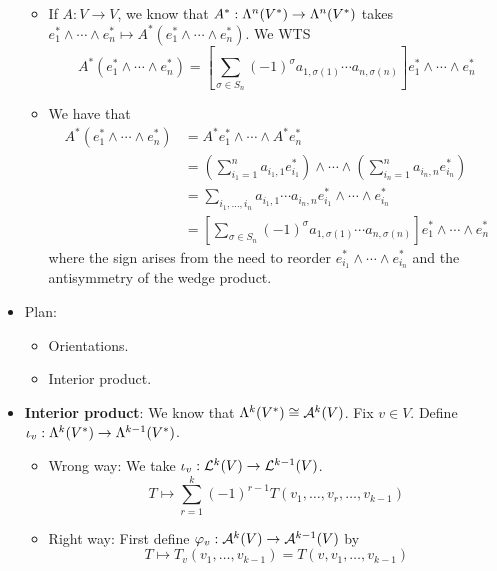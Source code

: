 \documentclass[../notes.tex]{subfiles}
\begin{document}
\begin{itemize}
    \begin{itemize}
        \item If $A:V\to V$, we know that $A^*:\lam[n]{V^*}\to\lam[n]{V^*}$ takes $e_1^*\wedge\cdots\wedge e_n^*\mapsto A^*(e_1^*\wedge\cdots\wedge e_n^*)$. We WTS
        \begin{equation*}
            A^*(e_1^*\wedge\cdots\wedge e_n^*) = \left[ \sum_{\sigma\in S_n}(-1)^\sigma a_{1,\sigma(1)}\cdots a_{n,\sigma(n)} \right]e_1^*\wedge\cdots\wedge e_n^*
        \end{equation*}
        \item We have that
        \begin{align*}
            A^*(e_1^*\wedge\cdots\wedge e_n^*) &= A^*e_1^*\wedge\cdots\wedge A^*e_n^*\\
            &= \left( \sum_{i_1=1}^na_{i_1,1}e_{i_1}^* \right)\wedge\cdots\wedge\left( \sum_{i_n=1}^na_{i_n,n}e_{i_n}^* \right)\\
            &= \sum_{i_1,\dots,i_n}a_{i_1,1}\cdots a_{i_n,n}e_{i_1}^*\wedge\cdots\wedge e_{i_n}^*\\
            &= \left[ \sum_{\sigma\in S_n}(-1)^\sigma a_{1,\sigma(1)}\cdots a_{n,\sigma(n)} \right]e_1^*\wedge\cdots\wedge e_n^*
        \end{align*}
        where the sign arises from the need to reorder $e_{i_1}^*\wedge\cdots\wedge e_{i_n}^*$ and the antisymmetry of the wedge product.
    \end{itemize}
    \item {}Plan:
    \begin{itemize}
        \item Orientations.
        \item Interior product.
    \end{itemize}
    \item \textbf{Interior product}: We know that $\lam[k]{V^*}\cong\alt[k]{V}$. Fix $v\in V$. Define $\iota_v:\lam[k]{V^*}\to\lam[k-1]{V^*}$.
    \begin{itemize}
        \item Wrong way: We take $\iota_v:\lin[k]{V}\to\lin[k-1]{V}$.
        \begin{equation*}
            T \mapsto \sum_{r=1}^k(-1)^{r-1}T(v_1,\dots,v_r,\dots,v_{k-1})
        \end{equation*}
        \item Right way: First define $\varphi_v:\alt[k]{V}\to\alt[k-1]{V}$ by
        \begin{equation*}
            T \mapsto T_v(v_1,\dots,v_{k-1})=T(v,v_1,\dots,v_{k-1})

\end{equation*}
\end{itemize}
\end{itemize}
\end{document}
